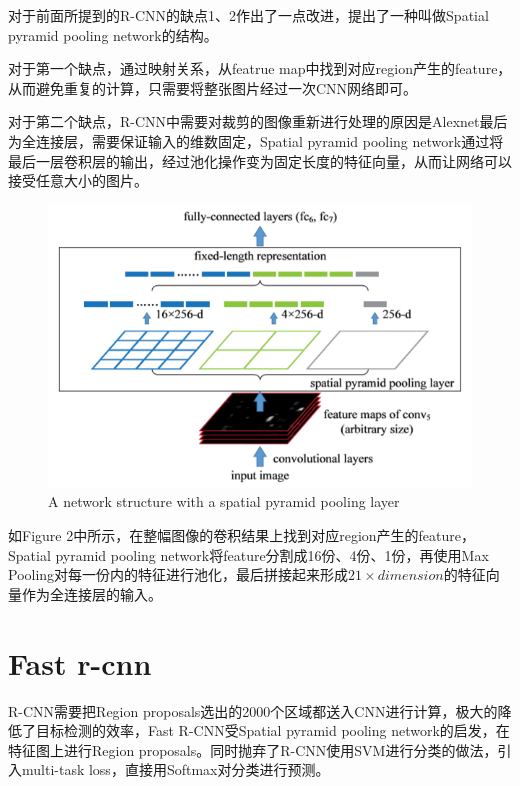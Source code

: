 \documentclass[12pt,onecolumn]{article}
\begin{document}
    对于前面所提到的R-CNN的缺点1、2作出了一点改进，提出了一种叫做Spatial pyramid pooling network的结构。

    对于第一个缺点，通过映射关系，从featrue map中找到对应region产生的feature，从而避免重复的计算，只需要将整张图片经过一次CNN网络即可。

    对于第二个缺点，R-CNN中需要对裁剪的图像重新进行处理的原因是Alexnet最后为全连接层，需要保证输入的维数固定，Spatial pyramid pooling network通过将最后一层卷积层的输出，经过池化操作变为固定长度的特征向量，从而让网络可以接受任意大小的图片。

    \begin{figure}[htb]
        \centering
        \includegraphics[width=\linewidth]{figure/spp.png}
        \caption{A network structure with a spatial pyramid pooling layer}
    \end{figure}

    如Figure 2中所示，在整幅图像的卷积结果上找到对应region产生的feature，Spatial pyramid pooling network将feature分割成16份、4份、1份，再使用Max Pooling对每一份内的特征进行池化，最后拼接起来形成$21\times dimension$的特征向量作为全连接层的输入。
    
    \section{Fast r-cnn\cite{girshick2015fast}}

    R-CNN需要把Region proposals选出的2000个区域都送入CNN进行计算，极大的降低了目标检测的效率，Fast R-CNN受Spatial pyramid pooling network的启发，在特征图上进行Region proposals。同时抛弃了R-CNN使用SVM进行分类的做法，引入multi-task loss，直接用Softmax对分类进行预测。
\end{document}
